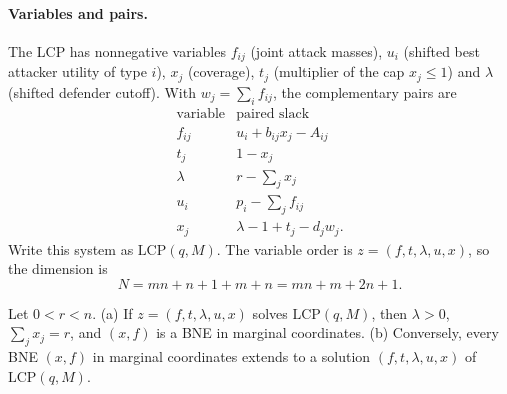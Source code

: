\paragraph{Variables and pairs.} The LCP has nonnegative variables $f_{ij}$ (joint attack masses),
$u_i$ (shifted best attacker utility of type $i$), $x_j$ (coverage), $t_j$ (multiplier of the cap
$x_j\le1$) and $\lambda$ (shifted defender cutoff). With $w_j=\sum_if_{ij}$, the complementary pairs are
\begin{equation}\label{app-dl:eq:lcp}
\begin{array}{c|l}
  \text{variable} & \text{paired slack}\\\hline
  f_{ij} & u_i+b_{ij}x_j-A_{ij}\\
  t_j    & 1-x_j\\
  \lambda& r-\sum_jx_j\\
  u_i    & p_i-\sum_jf_{ij}\\
  x_j    & \lambda-1+t_j-d_jw_j .
\end{array}
\end{equation}
Write this system as $\mathrm{LCP}(q,M)$. The variable order is $z=(f,t,\lambda,u,x)$, so the dimension is
\[
  N=mn+n+1+m+n=mn+m+2n+1 .
\]

\begin{lemma}\label{app-dl:lem:formulation}
\statuslean
Let $0<r<n$. (a) If $z=(f,t,\lambda,u,x)$ solves $\mathrm{LCP}(q,M)$, then $\lambda>0$,
$\sum_jx_j=r$, and $(x,f)$ is a BNE in marginal coordinates. (b) Conversely, every BNE $(x,f)$ in
marginal coordinates extends to a solution $(f,t,\lambda,u,x)$ of $\mathrm{LCP}(q,M)$.
\end{lemma}

